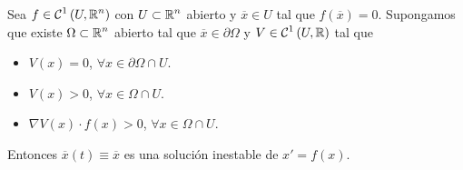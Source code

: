 \begin{theorem}
Sea $\displaystyle f \in \mathcal{C}^{1}\left(U, \mathbb{R}^{n}\right) $ con $\displaystyle U \subset \mathbb{R}^{n} $ abierto y $\displaystyle \overline{x}\in U $ tal que $\displaystyle f\left(\overline{x}\right)= 0 $. Supongamos que existe $\displaystyle \Omega\subset\mathbb{R}^{n} $ abierto tal que $\displaystyle \overline{x}\in \partial \Omega  $ y $\displaystyle V \in \mathcal{C}^{1}\left(U, \mathbb{R}\right) $ tal que 
\begin{itemize}
\item $\displaystyle V\left(x\right)=0 $, $\displaystyle \forall x \in \partial \Omega \cap U $.
\item $\displaystyle V\left(x\right)>0 $, $\displaystyle \forall x \in \Omega \cap U $.
\item $\displaystyle \nabla V\left(x\right) \cdot f\left(x\right) > 0 $, $\displaystyle \forall x \in \Omega \cap U $. 
\end{itemize}
Entonces $\displaystyle \overline{x}\left(t\right)\equiv \overline{x} $ es una solución inestable de $\displaystyle x' = f\left(x\right) $. 
\end{theorem}
